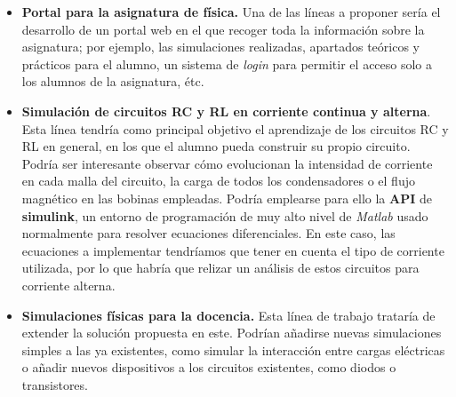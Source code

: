 \documentclass[../main.tex]{subfiles}
\begin{document}
\begin{itemize}
    \item \textbf{Portal para la asignatura de física. }Una de las líneas a proponer sería el desarrollo de un portal web en el que recoger toda la información sobre la asignatura; por ejemplo, las simulaciones realizadas, apartados teóricos y prácticos para el alumno, un sistema de \textit{login} para permitir el acceso solo a los alumnos de la asignatura, étc. 


    \item \textbf{Simulación de circuitos RC y RL en corriente continua y alterna}. Esta línea tendría como principal objetivo el aprendizaje de los circuitos RC y RL en general, en los que el alumno pueda construir su propio circuito. Podría ser interesante observar cómo evolucionan la intensidad de corriente en cada malla del circuito, la carga de todos los condensadores o el flujo magnético en las bobinas empleadas. Podría emplearse para ello la \textbf{API} de \textbf{simulink}, un entorno de programación de muy alto nivel de \textit{Matlab} usado normalmente para resolver ecuaciones diferenciales. En este caso, las ecuaciones a implementar tendríamos que tener en cuenta el tipo de corriente utilizada, por lo que habría que relizar un análisis de estos circuitos para corriente alterna.
    
    \item \textbf{Simulaciones físicas para la docencia. }Esta línea de trabajo trataría de extender la solución propuesta en este. Podrían añadirse nuevas simulaciones simples a las ya existentes, como simular la interacción entre cargas eléctricas o añadir nuevos dispositivos a los circuitos existentes, como diodos o transistores.
    

\end{itemize}
\end{document}
